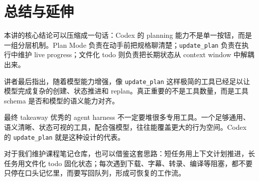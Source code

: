 \section{总结与延伸}

本讲的核心结论可以压缩成一句话：Codex 的 planning 能力不是单一按钮，而是一组分层机制。Plan Mode 负责在动手前把规格聊清楚；\texttt{update\_plan} 负责在执行中维护 live progress；文件化 todo 则负责把长期状态从 context window 中解耦出来。

讲者最后指出，随着模型能力增强，像 \texttt{update\_plan} 这样极简的工具已经足以让模型完成复杂的创建、状态推进和 replan。真正重要的不是工具数量，而是工具 schema 是否和模型的语义能力对齐。

\begin{importantbox}{最终 takeaway}
优秀的 agent harness 不一定要堆很多专用工具。一个足够通用、语义清晰、状态可视的工具，配合强模型，往往能覆盖更大的行为空间。Codex 的 \texttt{update\_plan} 就是这种设计的代表。
\end{importantbox}

对于我们维护课程笔记仓库，也可以借鉴这套思路：短任务用上下文计划推进，长任务用文件化 todo 固化状态；每次遇到下载、字幕、转录、编译等阻塞，都不要只停在口头记忆里，而要写回队列，形成可恢复的工作流。


